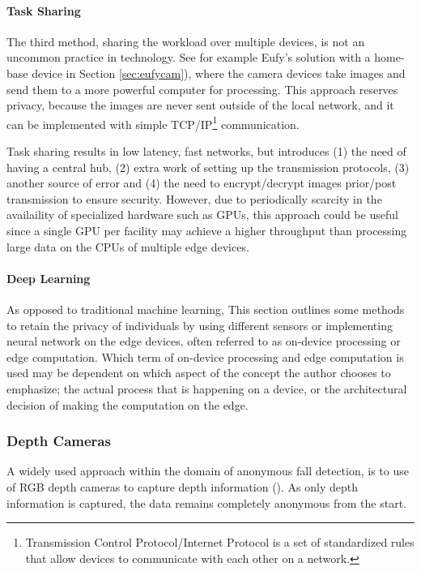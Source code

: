 \paragraph{Task Sharing}
The third method, sharing the workload over multiple devices, is not an uncommon practice in technology. See for example Eufy's solution with a home-base device in Section \ref{sec:eufycam}), where the camera devices take images and send them to a more powerful computer for processing. This approach reserves privacy, because the images are never sent outside of the local network, and it can be implemented with simple TCP/IP\footnote{Transmission Control Protocol/Internet Protocol is a set of standardized rules that allow devices to communicate with each other on a network.} communication. 

Task sharing results in low latency, fast networks, but introduces (1) the need of having a central hub, (2) extra work of setting up the transmission protocols, (3) another source of error and (4) the need to encrypt/decrypt images prior/post transmission to ensure security. However, due to periodically scarcity in the availaility of specialized hardware such as GPUs, this approach could be useful since a single GPU per facility may achieve a higher throughput than processing large data on the CPUs of multiple edge devices.

\paragraph{Deep Learning}
As opposed to traditional machine learning,
This section outlines some methods to retain the privacy of individuals by using different sensors or implementing neural network on the edge devices, often referred to as on-device processing or edge computation. Which term of on-device processing and edge computation is used may be dependent on which aspect of the concept the author chooses to emphasize; the actual process that is happening on a device, or the architectural decision of making the computation on the edge.

\subsubsection{Depth Cameras}
A widely used approach within the domain of anonymous fall detection, is to use of RGB depth cameras to capture depth information (\cite{wa2020elderly_fall_detection_meta}). As only depth information is captured, the data remains completely anonymous from the start.

